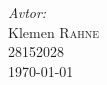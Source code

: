 \documentclass[slovene,11pt,a4paper]{article}
\numberwithin{equation}{section} %
\numberwithin{figure}{section} %
\numberwithin{table}{section} %
\begin{document}
\begin{titlepage}



\Large \emph{Avtor:}\\
Klemen \textsc{Rahne}\\
28152028\\[2cm]

{\large \today } \\[0.5cm] %

	

\end{titlepage}




\end{document}

